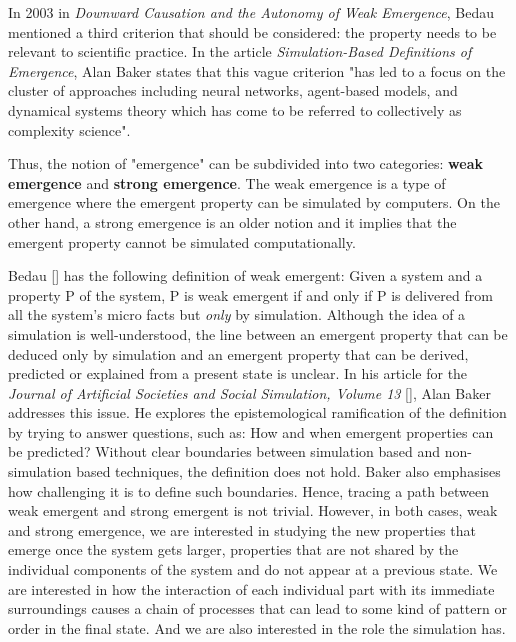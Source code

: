\documentclass[../main.tex]{subfiles}
\begin{document}
In 2003 in \textit{Downward Causation and the Autonomy of Weak Emergence}\cite[]{bedau_downwardCausation}, Bedau mentioned a third criterion that should be considered: the property needs to be relevant to scientific practice. In the article \textit{Simulation-Based Definitions of Emergence}\cite[]{baker_defEmergence}, Alan Baker states that this vague criterion "has led to a focus on the cluster of approaches including neural networks, agent-based models, and dynamical systems theory which has come to be referred to collectively as complexity science".

Thus, the notion of "emergence" can be subdivided into two categories: \textbf{weak emergence} and \textbf{strong emergence}. The weak emergence is a type of emergence where the emergent property can be simulated by computers. On the other hand, a strong emergence is an older notion and it implies that the emergent property cannot be simulated computationally.


Bedau [\citeyear[]{bedau_downwardCausation}] has the following definition of weak emergent: Given a system and a property P of the system, P is weak emergent if and only if P is delivered from all the system's micro facts but \textit{only} by simulation. Although the idea of a simulation is well-understood, the line between an emergent property that can be deduced only by simulation and an emergent property that can be derived, predicted or explained from a present state is unclear. In his article for the \textit{Journal of Artificial Societies and Social Simulation, Volume 13} [\citeyear[]{baker_defEmergence}], Alan Baker addresses this issue. He explores the epistemological ramification of the definition by trying to answer questions, such as: How and when emergent properties can be predicted? Without clear boundaries between simulation based and non-simulation based techniques, the definition does not hold. Baker also emphasises how challenging it is to define such boundaries. Hence, tracing a path between weak emergent and strong emergent is not trivial. However, in both cases, weak and strong emergence, we are interested in studying the new properties that emerge once the system gets larger, properties that are not shared by the individual components of the system and do not appear at a previous state. We are interested in how the interaction of each individual part with its immediate surroundings causes a chain of processes that can lead to some kind of pattern or order in the final state. And we are also interested in the role the simulation has.
\end{document}
